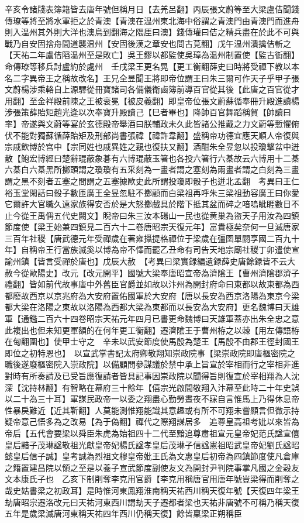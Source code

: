 辛亥令諸牋表簿籍皆去唐年號但稱月日【去羌呂翻】丙辰張文蔚等至大梁盧佶聞錢傳璙等將至將水軍拒之於青澳【青澳在温州東北海中俗謂之青澳門由青澳門而進舟則入温州其外則大洋也澳烏到翻海之隈厓曰澳】錢傳瓘曰佶之精兵盡在於此不可與戰乃自安固捨舟間道襲温州【安固後漢之章安也問古莧翻】戊午温州潰擒佶斬之【天祐二年盧佶䧟温州至是敗亡】吳王鏐以都監使吳璋為温州制置使【監古衘翻】命傳璙等移兵討盧約於處州　壬戌梁王更名晃【更工衡翻薛史曰時將受禪下教以本名二字異帝王之稱故改名】王兄全昱聞王將即帝位謂王曰朱三爾可作天子乎甲子張文蔚楊涉乘輅自上源驛從冊寶諸司各備儀衛鹵簿前導百官從其後【此唐之百官從才用翻】至金祥殿前陳之王被衮冕【被皮義翻】即皇帝位張文蔚蘇循奉冊升殿進讀楊涉張策薛貽矩趙光逢以次奉寶升殿讀己【巳者畢也】降帥百官舞蹈稱賀【帥讀曰率】帝遂與文蔚等宴於玄德殿帝舉酒曰朕輔政未久此皆諸公推戴之力文蔚等慙懼俯伏不能對獨蘇循薛貽矩及刑部尚書張禕【禕許韋翻】盛稱帝功德宜應天順人帝復與宗戚飲博於宫中【宗同姓也戚異姓之親也復扶又翻】酒酣朱全昱忽以投瓊擊盆中迸散【鮑宏博經曰楚辭琨蔽象碁有六博琨蔽玉箸也各投六箸行六棊故云六博用十二棊六棊白六棊黑所擲頭謂之瓊瓊有五采刻為一畫者謂之塞刻為兩畫者謂之白刻為三畫謂之黑不刻者五塞之間謂之五塞據歐史此所謂投瓊即骰子也迸北孟翻　考異曰王仁裕玉堂閑話曰骰子數匝廣王全昱忽駐不擲顧而白梁祖再呼朱三梁祖動容廣王曰你愛它爾許大官職久遠家族得安否於是大怒擲戲具於階下抵其盆而碎之喑嗚眦睚數日不止今從王禹偁五代史闕文】睨帝曰朱三汝本碭山一民也從黄巢為盜天子用汝為四鎮節度使【梁王始兼四鎮見二百六十二卷唐昭宗天復元年】富貴極矣奈何一旦滅唐家三百年社稷【唐武德元年受禪歲在著雍攝提格禪位于梁歲在彊圉單閼享國二百九十年】自稱帝王行當族滅奚以博為帝不懌而罷乙丑命有司告天地宗廟社稷丁卯遣使宣諭州鎮【皆言受禪於唐也】戊辰大赦　【考異曰梁實録編遺録薛史唐餘録皆不云大赦今從歐陽史】改元【改元開平】國號大梁奉唐昭宣帝為濟隂王【曹州濟隂郡濟子禮翻】皆如前代故事唐中外舊臣官爵並如故以汴州為開封府命曰東都以故東都為西都廢故西京以京兆府為大安府置佑國軍於大安府【唐以長安為西京洛陽為東京今梁都大梁在洛陽之東故以洛陽為西都大梁為東都而以長安為大安府】更名魏博曰天雄軍【通鑑二百六十四卷昭宗天祐元年四月已書更命魏博曰天雄軍蓋亦出朱全忠之意此複出也但未知更軍額的在何年更工衡翻】遷濟隂王于曹州栫之以棘【用左傳語栫在甸翻圍也】使甲士守之　辛未以武安節度使馬殷為楚王【馬殷不由郡王徑封國王即位之初特恩也】　以宣武掌書記太府卿敬翔知崇政院事【梁崇政院即唐樞密院之職後遂廢樞密院入崇政院】以備顧問參謀議於禁中承上旨宣於宰相而行之宰相非進對時有所奏請及已受旨應復請者皆具記事因崇政院以聞得旨則復宣於宰相翔為人沈深【沈持林翻】有智略在幕府三十餘年【僖宗光啟間敬翔入汴幕至此時二十年史誤以二十為三十耳】軍謀民政帝一以委之翔盡心勤勞晝夜不寐自言惟馬上乃得休息帝性暴戾難近【近其靳翻】人莫能測惟翔能識其意趣或有所不可翔未嘗顯言但微示持疑帝意己悟多為之改易【為于偽翻】禪代之際翔謀居多　追尊皇高祖考妣以來皆為帝后【五代會要梁以舜臣朱虎為始祖四十二代至黯追尊肅祖宣元皇帝妃范氏諡宣僖皇后黯子茂琳諡敬祖光獻皇帝妃楊氏諡孝皇后茂琳子信諡憲祖昭武皇帝妃劉氏諡昭懿皇后信子誠】皇考誠為烈祖文穆皇帝妣王氏為文惠皇后初帝為四鎮節度使凡倉庫之籍置建昌院以領之至是以養子宣武節度副使友文為開封尹判院事掌凡國之金穀友文本康氏子也　乙亥下制削奪李克用官爵【李克用稱唐官用唐年號豈梁得而削奪之哉史姑書梁之初政耳】是時惟河東鳳翔淮南稱天祐西川稱天復年號【天復四年梁王劫唐昭宗遷洛改元曰天祐河東西川謂劫天子遷都者梁也天祐非唐號不可稱乃稱天復五年是歲梁滅唐河東稱天祐四年西川仍稱天復】餘皆稟梁正朔稱臣